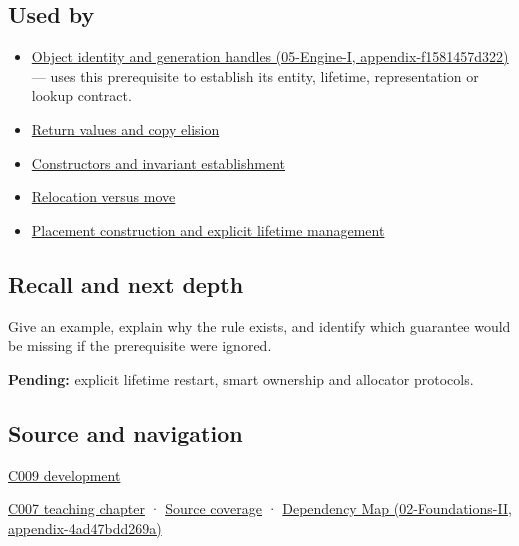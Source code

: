 \subsection{Used by}\label{appendix-a82f9c438857-used-by}

\begin{itemize}
\tightlist
\item
  \href{../05-Engine-I/main.pdf\#nameddest=appendix-f1581457d322}{Object identity and generation handles (05-Engine-I, appendix-f1581457d322)} --- uses this prerequisite to establish its entity, lifetime, representation or lookup contract.
\item
  \hyperref[appendix-b08d3788c5c6]{Return values and copy elision}
\item
  \hyperref[appendix-7f8ec83d0886]{Constructors and invariant establishment}
\item
  \hyperref[appendix-adfd6397af8d]{Relocation versus move}
\item
  \hyperref[appendix-f56c3e43fd4e]{Placement construction and explicit lifetime management}
\end{itemize}

\subsection{Recall and next depth}\label{appendix-a82f9c438857-recall-and-next-depth}

Give an example, explain why the rule exists, and identify which guarantee would be missing if the prerequisite were ignored.

\textbf{Pending:} explicit lifetime restart, smart ownership and allocator protocols.

\subsection{Source and navigation}\label{appendix-a82f9c438857-source-and-navigation}

\hyperref[appendix-fd090d982a15-m009---parts-127-147]{C009 development}

\hyperref[01-foundations-i-ch002-storage-is-a-place-an-object-is-its-occupant]{C007 teaching chapter} · \hyperref[appendix-fd090d982a15-m007---parts-101-112]{Source coverage} · \href{../02-Foundations-II/main.pdf\#nameddest=appendix-4ad47bdd269a}{Dependency Map (02-Foundations-II, appendix-4ad47bdd269a)}
